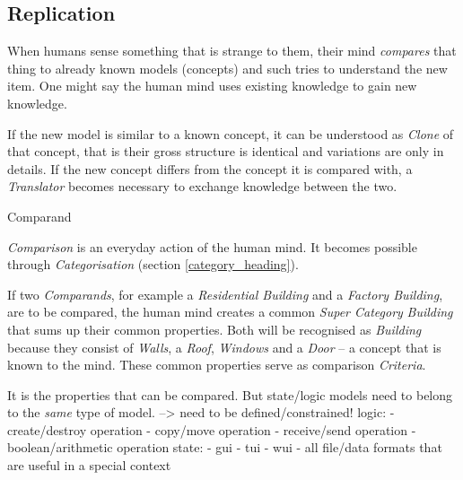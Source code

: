%
%
%
%
%
%
%

\subsection{Replication}
\label{replication_heading}

When humans sense something that is strange to them, their mind \emph{compares}
that thing to already known models (concepts) and such tries to understand the
new item. One might say the human mind uses existing knowledge to gain new
knowledge.

If the new model is similar to a known concept, it can be understood as
\emph{Clone} of that concept, that is their gross structure is identical and
variations are only in details.
If the new concept differs from the concept it is compared with, a
\emph{Translator} becomes necessary to exchange knowledge between the two.

Comparand

\emph{Comparison} is an everyday action of the human mind. It becomes possible
through \emph{Categorisation} (section \ref{category_heading}).

If two \emph{Comparands}, for example a \emph{Residential Building} and a
\emph{Factory Building}, are to be compared, the human mind creates a common
\emph{Super Category} \emph{Building} that sums up their common properties.
Both will be recognised as \emph{Building} because they consist of \emph{Walls},
a \emph{Roof}, \emph{Windows} and a \emph{Door} -- a concept that is known to
the mind. These common properties serve as comparison \emph{Criteria}.

It is the properties that can be compared.
But state/logic models need to belong to the \emph{same} type of model.
--> need to be defined/constrained!
logic:
- create/destroy operation
- copy/move operation
- receive/send operation
- boolean/arithmetic operation
state:
- gui
- tui
- wui
- all file/data formats that are useful in a special context


